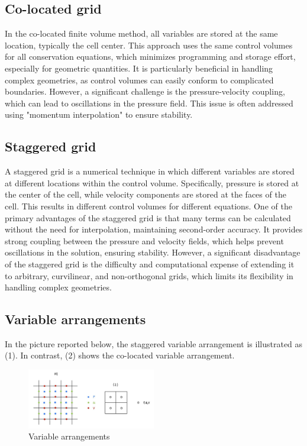 \documentclass{article}
\begin{document}
\subsection{Co-located grid}

In the co-located finite volume method, all variables are stored at the same location, typically the cell center. This approach uses the 
same control volumes for all conservation equations, which minimizes programming and storage effort, especially for geometric quantities. 
It is particularly beneficial in handling complex geometries, as control volumes can easily conform to complicated boundaries. However, 
a significant challenge is the pressure-velocity coupling, which can lead to oscillations in the pressure field. This issue is often 
addressed using "momentum interpolation" to ensure stability. 

\subsection{Staggered grid}

A staggered grid is a numerical technique in which different variables are stored at different locations within the control volume. 
Specifically, pressure is stored at the center of the cell, while velocity components are stored at the faces of the cell. This results in 
different control volumes for different equations. One of the primary advantages of the staggered grid is that many terms can be calculated 
without the need for interpolation, maintaining second-order accuracy. It provides strong coupling between the pressure and velocity fields, 
which helps prevent oscillations in the solution, ensuring stability. However, a significant disadvantage of the staggered grid is the difficulty 
and computational expense of extending it to arbitrary, curvilinear, and non-orthogonal grids, which limits its flexibility in handling complex geometries.

\subsection{Variable arrangements}

In the picture reported below, the staggered variable arrangement is illustrated as (1). In contrast, (2) shows the co-located variable arrangement.

\begin{figure}[h!]
  \centering
  \includegraphics[width=0.5\textwidth]{Variable.jpg}
  \caption{Variable arrangements}
\end{figure}
\end{document}
